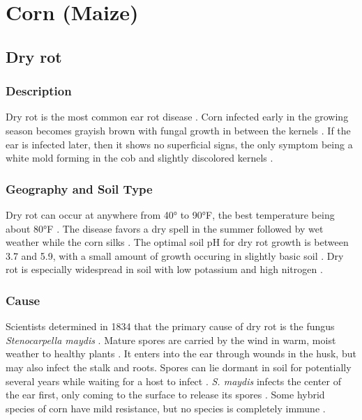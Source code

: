 \documentclass[12pt]{article}
\begin{document}
\section{Corn (Maize)}

\subsection{Dry rot}

\subsubsection{Description}

Dry rot is the most common ear rot disease \autocite{ullstrup1961corn}. Corn infected early in the growing season becomes grayish brown with fungal growth in between the kernels \autocite{ullstrup1961corn}. If the ear is infected later, then it shows no superficial signs, the only symptom being a white mold forming in the cob and slightly discolored kernels \autocite{ullstrup1961corn}.

\subsubsection{Geography and Soil Type}

Dry rot can occur at anywhere from 40° to 90°F, the best temperature being about 80°F \autocite{melhus1922dry}. The disease favors a dry spell in the summer followed by wet weather while the corn silks \autocite{ullstrup1961corn, melhus1922dry}. The optimal soil pH for dry rot growth is between 3.7 and 5.9, with a small amount of growth occuring in slightly basic soil \autocite{eddins1930dry}. Dry rot is especially widespread in soil with low potassium and high nitrogen \autocite{ullstrup1961corn}.

\subsubsection{Cause}

Scientists determined in 1834 that the primary cause of dry rot is the fungus \emph{Stenocarpella maydis} \autocite{durrell1923dry, ullstrup1961corn}. Mature spores are carried by the wind in warm, moist weather to healthy plants \autocite{ullstrup1961corn}. It enters into the ear through wounds in the husk, but may also infect the stalk and roots. Spores can lie dormant in soil for potentially several years while waiting for a host to infect \autocite{eddins1930dry}. \emph{S. maydis} infects the center of the ear first, only coming to the surface to release its spores \autocite{melhus1922dry}. Some hybrid species of corn have mild resistance, but no species is completely immune \autocite{ullstrup1961corn}.
\end{document}
